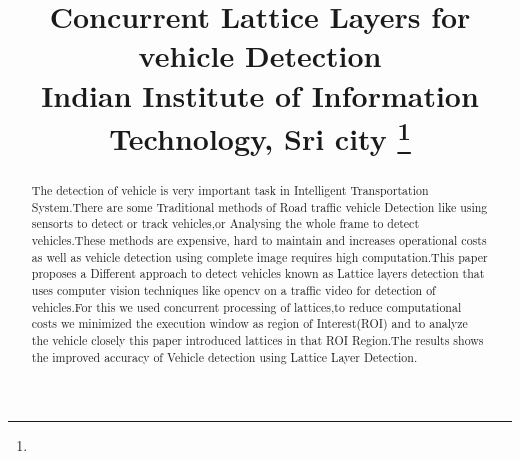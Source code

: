 \documentclass[conference]{IEEEtran}
\begin{document}
\title{Concurrent Lattice Layers for vehicle Detection \\
{\footnotesize  Indian Institute of Information Technology, Sri city}
\thanks{}
}

\author{
\and
{}
\and
{}
\and
{}
}

\maketitle

\begin{abstract}
The detection of vehicle is very important task in Intelligent Transportation System.There are some Traditional methods of Road traffic vehicle Detection like using sensorts to detect or track vehicles,or Analysing the whole frame to detect vehicles.These methods are expensive, hard to maintain and increases operational costs as well as vehicle detection using complete image requires high computation.This paper proposes a Different approach to detect vehicles known as Lattice layers detection that uses computer vision techniques like opencv on a traffic video for detection of vehicles.For this we used concurrent processing of lattices,to reduce computational costs we minimized the execution window as region of Interest(ROI) and to analyze the vehicle closely this paper introduced lattices in that ROI Region.The results shows the improved accuracy of Vehicle detection using Lattice Layer Detection.
\end{abstract}
\end{document}
